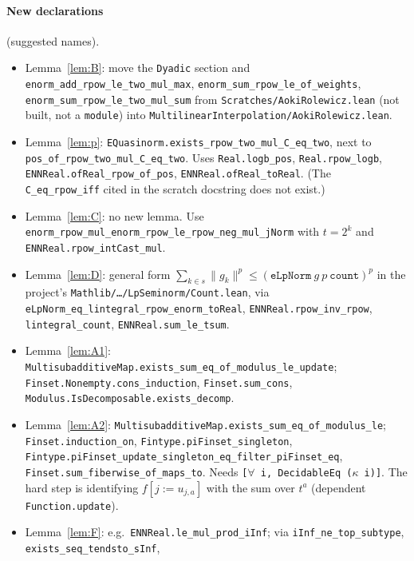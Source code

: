 \documentclass[11pt]{article}
\theoremstyle{definition}
\theoremstyle{remark}
\newcommand{\norm}[2]{\lVert #1\rVert_{#2}}
\newcommand{\upd}[3]{#1[#2 := #3]}
\begin{document}
\paragraph{New declarations} (suggested names).
\begin{itemize}
  \item Lemma~\ref{lem:B}: move the \texttt{Dyadic} section and
    \texttt{enorm\_add\_rpow\_le\_two\_mul\_max}, \texttt{enorm\_sum\_rpow\_le\_of\_weights},
    \texttt{enorm\_sum\_rpow\_le\_two\_mul\_sum} from \texttt{Scratches/AokiRolewicz.lean} (not
    built, not a \texttt{module}) into \texttt{MultilinearInterpolation/AokiRolewicz.lean}.
  \item Lemma~\ref{lem:p}: \texttt{EQuasinorm.exists\_rpow\_two\_mul\_C\_eq\_two}, next to
    \texttt{pos\_of\_rpow\_two\_mul\_C\_eq\_two}. Uses \texttt{Real.logb\_pos},
    \texttt{Real.rpow\_logb}, \texttt{ENNReal.ofReal\_rpow\_of\_pos},
    \texttt{ENNReal.ofReal\_toReal}. (The \texttt{C\_eq\_rpow\_iff} cited in the scratch
    docstring does not exist.)
  \item Lemma~\ref{lem:C}: no new lemma. Use
    \texttt{enorm\_rpow\_mul\_enorm\_rpow\_le\_rpow\_neg\_mul\_jNorm} with \(t = 2^k\) and
    \texttt{ENNReal.rpow\_intCast\_mul}.
  \item Lemma~\ref{lem:D}: general form
    \(\sum_{k\in s}\norm{g_k}{}^{p} \le (\texttt{eLpNorm}\ g\ p\ \texttt{count})^{p}\) in the
    project's \texttt{Mathlib/\dots/LpSeminorm/Count.lean}, via
    \texttt{eLpNorm\_eq\_lintegral\_rpow\_enorm\_toReal}, \texttt{ENNReal.rpow\_inv\_rpow},
    \texttt{lintegral\_count}, \texttt{ENNReal.sum\_le\_tsum}.
  \item Lemma~\ref{lem:A1}: \texttt{MultisubadditiveMap.exists\_sum\_eq\_of\_modulus\_le\_update};
    \texttt{Finset.Nonempty.cons\_induction}, \texttt{Finset.sum\_cons},
    \texttt{Modulus.IsDecomposable.exists\_decomp}.
  \item Lemma~\ref{lem:A2}: \texttt{MultisubadditiveMap.exists\_sum\_eq\_of\_modulus\_le};
    \texttt{Finset.induction\_on}, \texttt{Fintype.piFinset\_singleton},
    \texttt{Fintype.piFinset\_update\_singleton\_eq\_filter\_piFinset\_eq},
    \texttt{Finset.sum\_fiberwise\_of\_maps\_to}. Needs
    \texttt{[\(\forall\) i, DecidableEq (\(\kappa\) i)]}. The hard step is identifying
    \(\upd{f}{j}{u_{j,a}}\) with the sum over \(t^a\) (dependent \texttt{Function.update}).
  \item Lemma~\ref{lem:F}: e.g.\ \texttt{ENNReal.le\_mul\_prod\_iInf}; via
    \texttt{iInf\_ne\_top\_subtype}, \texttt{exists\_seq\_tendsto\_sInf},

\end{itemize}
\end{document}

